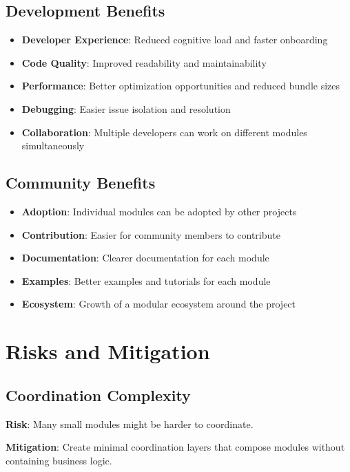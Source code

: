 \documentclass[11pt]{article}
\begin{document}
\subsection{Development Benefits}

\begin{itemize}
\item \textbf{Developer Experience}: Reduced cognitive load and faster onboarding
\item \textbf{Code Quality}: Improved readability and maintainability
\item \textbf{Performance}: Better optimization opportunities and reduced bundle sizes
\item \textbf{Debugging}: Easier issue isolation and resolution
\item \textbf{Collaboration}: Multiple developers can work on different modules simultaneously
\end{itemize}

\subsection{Community Benefits}

\begin{itemize}
\item \textbf{Adoption}: Individual modules can be adopted by other projects
\item \textbf{Contribution}: Easier for community members to contribute
\item \textbf{Documentation}: Clearer documentation for each module
\item \textbf{Examples}: Better examples and tutorials for each module
\item \textbf{Ecosystem}: Growth of a modular ecosystem around the project
\end{itemize}

\section{Risks and Mitigation}

\subsection{Coordination Complexity}

\textbf{Risk}: Many small modules might be harder to coordinate.

\textbf{Mitigation}: Create minimal coordination layers that compose modules without containing business logic.
\end{document}
